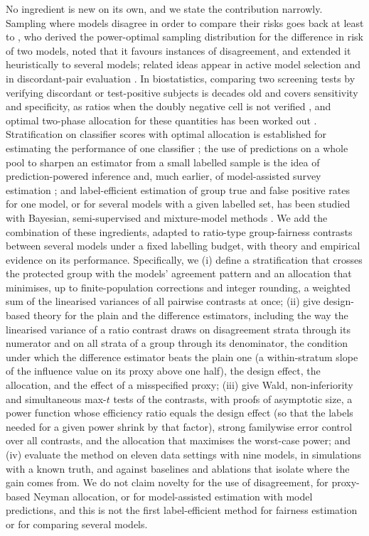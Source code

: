 \documentclass[pdflatex,sn-mathphys-num,iicol]{sn-jnl}
\theoremstyle{thmstyleone}
\theoremstyle{thmstyletwo}
\theoremstyle{thmstylethree}
\begin{document}
No ingredient is new on its own, and we state the contribution narrowly. Sampling where models disagree in order to compare their risks goes back at least to \citet{sawade2012active}, who derived the power-optimal sampling distribution for the difference in risk of two models, noted that it favours instances of disagreement, and extended it heuristically to several models; related ideas appear in active model selection \citep{hara2024,kay2025coda} and in discordant-pair evaluation \citep{musgrove2023discordant}. In biostatistics, comparing two screening tests by verifying discordant or test-positive subjects is decades old and covers sensitivity and specificity, as ratios when the doubly negative cell is not verified \citep{schatzkin1987,chock1997,pepe2001comparing}, and optimal two-phase allocation for these quantities has been worked out \citep{mcnamee2002}. Stratification on classifier scores with optimal allocation is established for estimating the performance of one classifier \citep{bennett2010online,kumar2018classifier,fisch2024stratppi}; the use of predictions on a whole pool to sharpen an estimator from a small labelled sample is the idea of prediction-powered inference \citep{angelopoulos2023ppi,fisch2024stratppi} and, much earlier, of model-assisted survey estimation \citep{sarndal1992,breidt2017}; and label-efficient estimation of group true and false positive rates for one model, or for several models with a given labelled set, has been studied with Bayesian, semi-supervised and mixture-model methods \citep{ji2020fairness,gao2025,shanmugam2025}. We add the combination of these ingredients, adapted to ratio-type group-fairness contrasts between several models under a fixed labelling budget, with theory and empirical evidence on its performance. Specifically, we (i) define a stratification that crosses the protected group with the models' agreement pattern and an allocation that minimises, up to finite-population corrections and integer rounding, a weighted sum of the linearised variances of all pairwise contrasts at once; (ii) give design-based theory for the plain and the difference estimators, including the way the linearised variance of a ratio contrast draws on disagreement strata through its numerator and on all strata of a group through its denominator, the condition under which the difference estimator beats the plain one (a within-stratum slope of the influence value on its proxy above one half), the design effect, the allocation, and the effect of a misspecified proxy; (iii) give Wald, non-inferiority and simultaneous max-$t$ tests of the contrasts, with proofs of asymptotic size, a power function whose efficiency ratio equals the design effect (so that the labels needed for a given power shrink by that factor), strong familywise error control over all contrasts, and the allocation that maximises the worst-case power; and (iv) evaluate the method on eleven data settings with nine models, in simulations with a known truth, and against baselines and ablations that isolate where the gain comes from. We do not claim novelty for the use of disagreement, for proxy-based Neyman allocation, or for model-assisted estimation with model predictions, and this is not the first label-efficient method for fairness estimation or for comparing several models.
\end{document}
